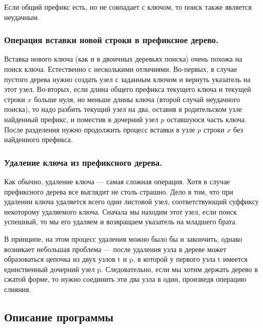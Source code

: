 \documentclass[12pt]{article}
\begin{document}
Если общий префикс есть, но не совпадает с ключом, то поиск также является неудачным.


\subsubsection*{Операция вставки новой строки в префиксное дерево.}


Вставка нового ключа (как и в двоичных деревьях поиска) очень похожа на поиск ключа. Естественно с несколькими отличиями. Во-первых, в случае пустого дерева нужно создать узел с заданным ключом и вернуть указатель на этот узел. Во-вторых, если длина общего префикса текущего ключа и текущей строки $x$ больше нуля, но меньше длины ключа (второй случай неудачного поиска), то надо разбить текущий узел на два, оставив в родительском узле найденный префикс, и поместив в дочерний узел $p$ оставшуюся часть ключа. После разделения нужно продолжить процесс вставки в узле $p$ строки $x$ без найденного префикса.


\subsubsection*{Удаление ключа из префиксного дерева.}


Как обычно, удаление ключа — самая сложная операция. Хотя в случае префиксного дерева все выглядит не столь страшно. Дело в том, что при удалении ключа удаляется всего один листовой узел, соответствующий суффиксу некоторому удаляемого ключа. Сначала мы находим этот узел, если поиск успешный, то мы его удаляем и возвращаем указатель на младшего брата. 


В принципе, на этом процесс удаления можно было бы и закончить, однако возникает небольшая проблема — после удаления узла в дереве может образоваться цепочка из двух узлов t и p, в которой у первого узла t имеется единственный дочерний узел p. Следовательно, если мы хотим держать дерево в сжатой форме, то нужно соединить эти два узла в один, произведя операцию слияния. 



\subsection*{Описание программы}
\end{document}

